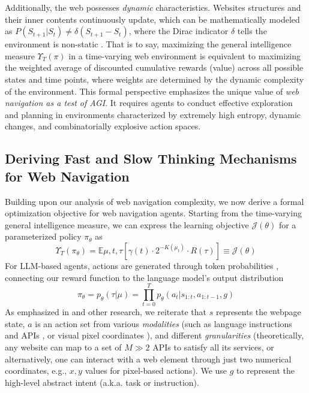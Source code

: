 \documentclass{article}
\begin{document}
Additionally, the web possesses \textit{dynamic} characteristics. Websites structures and their inner contents continuously update, which can be mathematically modeled as $P(S_{t+1}|S_t) \neq \delta(S_{t+1} - S_t)$, where the Dirac indicator $\delta$ tells the environment is non-static \citep{puterman2014markov}. That is to say, maximizing the general intelligence measure $\Upsilon_T(\pi)$ in a time-varying web environment is equivalent to maximizing the weighted average of discounted cumulative rewards (value) across all possible states and time points, where weights are determined by the dynamic complexity of the environment.  This formal perspective emphasizes the unique value of \textit{web navigation as a test of AGI}. It requires agents to conduct effective exploration and planning in environments characterized by extremely high entropy, dynamic changes, and combinatorially explosive action spaces.

\subsection{Deriving Fast and Slow Thinking Mechanisms for Web Navigation}
\label{sec2.2}

Building upon our analysis of web navigation complexity, we now derive a formal optimization objective for web navigation agents. Starting from the time-varying general intelligence measure, we can express the learning objective $\mathcal{J}(\theta)$ for a parameterized policy $\pi_\theta$ as
\begin{equation}
\Upsilon_T(\pi_\theta) = \mathbb{E}{\mu,t,\tau}\left[\gamma(t) \cdot 2^{-K(\mu_t)} \cdot R(\tau)\right] \equiv \mathcal{J}(\theta)
\end{equation}
For LLM-based agents, actions are generated through token probabilities \citep{sumers2023cognitive}, connecting our reward function to the language model's output distribution
\begin{equation}
\pi_{\theta}=p_\theta(\tau|\mu) = \prod_{t=0}^{T} p_\theta(a_t|s_{1:t}, a_{1:t-1}, g)
\end{equation}
As emphasized in \cite{yao2022webshop} and other research, we reiterate that $s$ represents the webpage state, $a$ is an action set from various \textit{modalities} (such as language instructions and APIs \citep{lu2024weblinx, gur2023real}, or visual pixel coordinates \citep{lee2023pix2struct}), and different \textit{granularities} (theoretically, any website can map to a set of $M \gg 2$ APIs to satisfy all its services, or alternatively, one can interact with a web element through just two numerical coordinates, e.g., $x, y$ values for pixel-based actions). We use $g$ to represent the high-level abstract intent (a.k.a. task or instruction).
\end{document}
